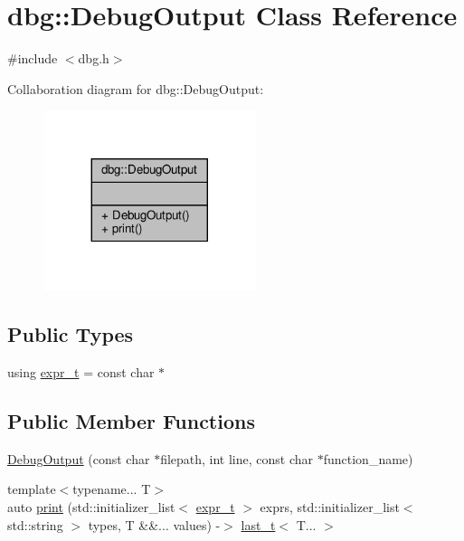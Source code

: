 \hypertarget{classdbg_1_1DebugOutput}{}\section{dbg\+:\+:Debug\+Output Class Reference}
\label{classdbg_1_1DebugOutput}


{\ttfamily \#include $<$dbg.\+h$>$}



Collaboration diagram for dbg\+:\+:Debug\+Output\+:\nopagebreak
\begin{figure}[H]
\begin{center}
\leavevmode
\includegraphics[width=176pt]{d2/de9/classdbg_1_1DebugOutput__coll__graph}
\end{center}
\end{figure}
\subsection*{Public Types}
\begin{DoxyCompactItemize}
\item 
using \hyperlink{classdbg_1_1DebugOutput_a5d9b38d5b9276cb584c0e20e9b1a2045}{expr\+\_\+t} = const char $\ast$
\end{DoxyCompactItemize}
\subsection*{Public Member Functions}
\begin{DoxyCompactItemize}
\item 
\hyperlink{classdbg_1_1DebugOutput_a7bb0378758aa1006e2423eff57ee36a2}{Debug\+Output} (const char $\ast$filepath, int line, const char $\ast$function\+\_\+name)
\item 
{\footnotesize template$<$typename... T$>$ }\\auto \hyperlink{classdbg_1_1DebugOutput_aa135787802db4a6b0b4eb185185e13ca}{print} (std\+::initializer\+\_\+list$<$ \hyperlink{classdbg_1_1DebugOutput_a5d9b38d5b9276cb584c0e20e9b1a2045}{expr\+\_\+t} $>$ exprs, std\+::initializer\+\_\+list$<$ std\+::string $>$ types, T \&\&... values) -\/$>$ \hyperlink{namespacedbg_a4754c7365d6eb31696a4613230e21ac4}{last\+\_\+t}$<$ T... $>$
\end{DoxyCompactItemize}


